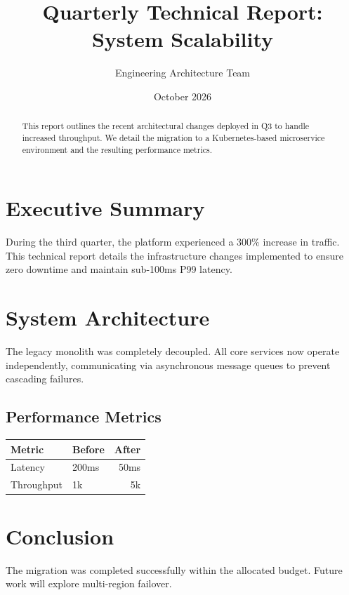 \documentclass[11pt,a4paper]{article}
\begin{document}
\title{\textbf{Quarterly Technical Report: System Scalability}}
\author{Engineering Architecture Team}
\date{October 2026}
\maketitle

\begin{abstract}
This report outlines the recent architectural changes deployed in Q3 to handle increased throughput. We detail the migration to a Kubernetes-based microservice environment and the resulting performance metrics.
\end{abstract}

\tableofcontents
\vspace{5mm}

\section{Executive Summary}
During the third quarter, the platform experienced a 300\% increase in traffic. This technical report details the infrastructure changes implemented to ensure zero downtime and maintain sub-100ms P99 latency. 

\section{System Architecture}
The legacy monolith was completely decoupled. All core services now operate independently, communicating via asynchronous message queues to prevent cascading failures.

\subsection{Performance Metrics}
\begin{center}
\begin{tabular}{llr}
\toprule
Metric & Before & After \\
\midrule
Latency & 200ms & 50ms \\
Throughput & 1k & 5k \\
\bottomrule
\end{tabular}
\end{center}

\section{Conclusion}
The migration was completed successfully within the allocated budget. Future work will explore multi-region failover.
\end{document}
